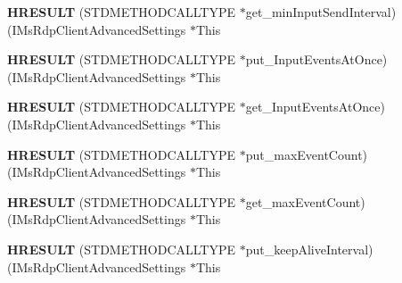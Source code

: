 \begin{DoxyCompactItemize}
\item 
\mbox{\label{struct_i_ms_rdp_client_advanced_settings_vtbl_a13681c38dd0e2a71f046d46d45887739}} 
{\bfseries H\+R\+E\+S\+U\+LT} (S\+T\+D\+M\+E\+T\+H\+O\+D\+C\+A\+L\+L\+T\+Y\+PE $\ast$get\+\_\+min\+Input\+Send\+Interval)(I\+Ms\+Rdp\+Client\+Advanced\+Settings $\ast$This
\item 
\mbox{\label{struct_i_ms_rdp_client_advanced_settings_vtbl_ad4206bfaea514d8c54233653eed4e5b8}} 
{\bfseries H\+R\+E\+S\+U\+LT} (S\+T\+D\+M\+E\+T\+H\+O\+D\+C\+A\+L\+L\+T\+Y\+PE $\ast$put\+\_\+\+Input\+Events\+At\+Once)(I\+Ms\+Rdp\+Client\+Advanced\+Settings $\ast$This
\item 
\mbox{\label{struct_i_ms_rdp_client_advanced_settings_vtbl_aa6ee6e4ebe543422ffa1688bf6d97c9a}} 
{\bfseries H\+R\+E\+S\+U\+LT} (S\+T\+D\+M\+E\+T\+H\+O\+D\+C\+A\+L\+L\+T\+Y\+PE $\ast$get\+\_\+\+Input\+Events\+At\+Once)(I\+Ms\+Rdp\+Client\+Advanced\+Settings $\ast$This
\item 
\mbox{\label{struct_i_ms_rdp_client_advanced_settings_vtbl_aa6abd60e1cda16ce5560b940b05a0da0}} 
{\bfseries H\+R\+E\+S\+U\+LT} (S\+T\+D\+M\+E\+T\+H\+O\+D\+C\+A\+L\+L\+T\+Y\+PE $\ast$put\+\_\+max\+Event\+Count)(I\+Ms\+Rdp\+Client\+Advanced\+Settings $\ast$This
\item 
\mbox{\label{struct_i_ms_rdp_client_advanced_settings_vtbl_a164e82b7e5bfa9e01ef08e146d66e129}} 
{\bfseries H\+R\+E\+S\+U\+LT} (S\+T\+D\+M\+E\+T\+H\+O\+D\+C\+A\+L\+L\+T\+Y\+PE $\ast$get\+\_\+max\+Event\+Count)(I\+Ms\+Rdp\+Client\+Advanced\+Settings $\ast$This
\item 
\mbox{\label{struct_i_ms_rdp_client_advanced_settings_vtbl_a4460d60ee001ca847b973507bf7842ea}} 
{\bfseries H\+R\+E\+S\+U\+LT} (S\+T\+D\+M\+E\+T\+H\+O\+D\+C\+A\+L\+L\+T\+Y\+PE $\ast$put\+\_\+keep\+Alive\+Interval)(I\+Ms\+Rdp\+Client\+Advanced\+Settings $\ast$This
\item 
\mbox{\label{struct_i_ms_rdp_client_advanced_settings_vtbl_a3371216033cc75887c33ca4834f0984e}} 

\end{DoxyCompactItemize}
